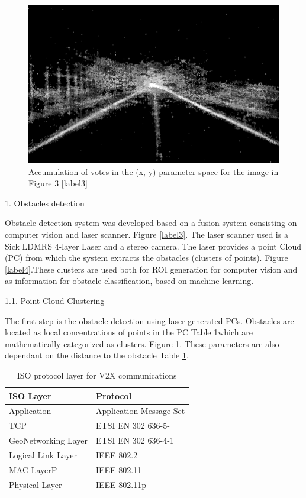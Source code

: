 \documentclass[12pt]{article}
\begin{document}
\begin{figure}
    \centering
    \includegraphics[width=0.75\linewidth]{image5.png}
    \caption{Accumulation of votes in the (x, y) parameter space for the image in Figure 3 \ref{label3}}
    \label{label5}
\end{figure}

\newpage
\hspace{5mm}
1. Obstacles detection 

\raggedright Obstacle detection system was developed based on a fusion system consisting on computer vision and laser scanner. Figure \ref{label3}. The laser scanner used is a Sick LDMRS 4-layer Laser and a stereo camera. The laser provides a point Cloud (PC) from which the system extracts the obstacles (clusters of points). Figure \ref{label4}.These clusters are used both for ROI generation for computer vision and as information for obstacle classification, based on machine learning.


\hspace{5mm}
1.1. Point Cloud Clustering 

\raggedrigh The first step is the obstacle detection using laser generated PCs. Obstacles are located as local concentrations of points in the PC Table 1which are mathematically categorized as clusters. Figure \ref{label5}. These parameters are also dependant on the distance to the obstacle Table \ref{tab2}.

\begin{table}[h!]
    \begin{center}
        \caption{ISO protocol layer for V2X communications}
        \label{tab2}
          \begin{tabular}{|p{5cm}|p{5cm}|}
          \hline
           ISO Layer&Protocol\\
          \hline
          Application&Application Message Set\\
          \hline
          TCP&ETSI EN 302 636-5-\\
          \hline
          GeoNetworking Layer&ETSI EN 302 636-4-1\\
          \hline
          Logical Link Layer&IEEE 802.2\\
          \hline
          MAC LayerP&IEEE 802.11\\
          \hline
          Physical Layer&IEEE 802.11p\\
          \hline
          \end{tabular}
   \end{center}
\end{table}
\end{document}
